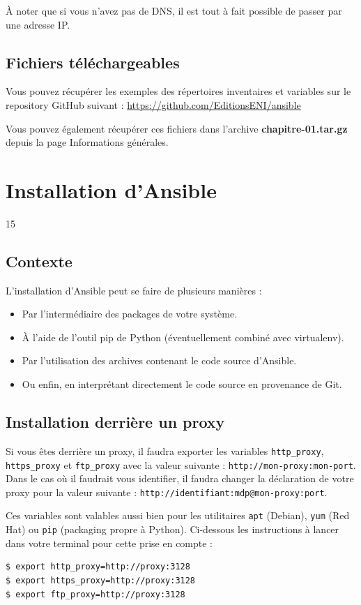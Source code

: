 \documentclass[hidelinks]{article}
\begin{document}
À noter que si vous n'avez pas de DNS, il est tout à fait possible de passer par une adresse IP.

\subsection{Fichiers téléchargeables}
Vous pouvez récupérer les exemples des répertoires inventaires et variables sur le repository GitHub suivant : \url{https://github.com/EditionsENI/ansible}

Vous pouvez également récupérer ces fichiers dans l'archive \textbf{chapitre-01.tar.gz} depuis la page Informations générales.

\section{Installation d'Ansible}
\label{sec:Installation d'Ansible}
15
\subsection{Contexte}
L'installation d'Ansible peut se faire de plusieurs manières :
\begin{itemize}
    \item Par l'intermédiaire des packages de votre système.
    \item À l'aide de l'outil pip de Python (éventuellement combiné avec virtualenv).
    \item Par l'utilisation des archives contenant le code source d'Ansible.
    \item Ou enfin, en interprétant directement le code source en provenance de Git.
\end{itemize}

\subsection{Installation derrière un proxy}
Si vous êtes derrière un proxy, il faudra exporter les variables \texttt{http\_proxy}, \texttt{https\_proxy} et \texttt{ftp\_proxy} avec la valeur suivante : \texttt{http://mon-proxy:mon-port}. Dans le cas où il faudrait vous identifier, il faudra changer la déclaration de votre proxy pour la valeur suivante : \texttt{http://identifiant:mdp@mon-proxy:port}.

Ces variables sont valables aussi bien pour les utilitaires \texttt{apt} (Debian), \texttt{yum} (Red Hat) ou \texttt{pip} (packaging propre à Python). Ci-dessous les instructions à lancer dans votre terminal pour cette prise en compte :
\begin{verbatim}
$ export http_proxy=http://proxy:3128 
$ export https_proxy=http://proxy:3128 
$ export ftp_proxy=http://proxy:3128
\end{verbatim}
\end{document}
